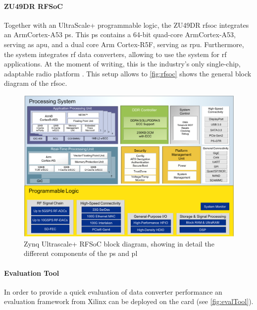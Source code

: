 \paragraph{ZU49DR RFSoC}
Together with an UltraScale+ programmable logic, the ZU49DR \gls{rfsoc} integrates an Arm\textregistered Cortex\texttrademark-A53 \gls{ps}.
This \gls{ps} contains a 64-bit quad-core Arm\textregistered Cortex\texttrademark-A53, serving as \gls{apu}, and a dual core Arm Cortex-R5F, serving as \gls{rpu}.
Furthermore, the system integrates \gls{rf} data converters, allowing to use the system for \gls{rf} applications.
At the moment of writing, this is the industry's only single-chip, adaptable radio platform \cite{zu49}.
This setup allows to 
\autoref{fig:rfsoc} shows the general block diagram of the \gls{rfsoc}.

\begin{figure}[tbh]
	\centering
	\includegraphics[width = \textwidth]{chap/04-work/img/rfsoc_blockdiagram}
	\caption[Zynq Ultrascale+ RFSoC block diagram]{Zynq Ultrascale+ RFSoC block diagram, showing in detail the different components of the \gls{ps} and \gls{pl}}
	\label{fig:rfsoc}
\end{figure}

\paragraph{Evaluation Tool}
In order to provide a quick evaluation of data converter performance an evaluation framework from Xilinx can be deployed on the card (see \autoref{fig:evalTool}). 

